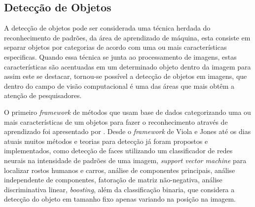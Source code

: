 \subsection{Detecção de Objetos}
\label{Sec:TiposDeDeteccaoDeObjetos}
	

A detecção de objetos pode ser considerada uma técnica herdada do reconhecimento de padrões, da área de aprendizado de máquina, esta consiste em separar objetos por categorias de acordo com uma ou mais características especificas. Quando essa técnica se junta ao processamento de imagens, estas características são acentuadas em um determinado objeto dentro da imagem para assim este se destacar, tornou-se possível a detecção de objetos em imagens, que dentro do campo de visão computacional é uma das áreas que mais obtêm a atenção de pesquisadores. 

O primeiro {\it framework} de métodos que usam base de dados categorizando uma ou mais características de um objetos para fazer o reconhecimento através de aprendizado foi apresentado por . Desde o {\it framework}  de Viola e Jones até os dias atuais muitos métodos e teorias para detecção já foram propostos e implementados, como detecção de faces utilizando um classificador de redes neurais na intensidade de padrões de uma imagem, {\it support vector machine} para localizar rostos humanos e carros\cite{Nascimento:2007}, análise de componentes principais, análise independente de componentes, fatoração de matriz não-negativa, análise discriminativa linear,  {\it boosting}\cite{Roth:2008}, além da classificação binaria, que considera a detecção do objeto em tamanho fixo apenas variando na posição na imagem\cite{AmitFelzenszwalb:2014}. 

